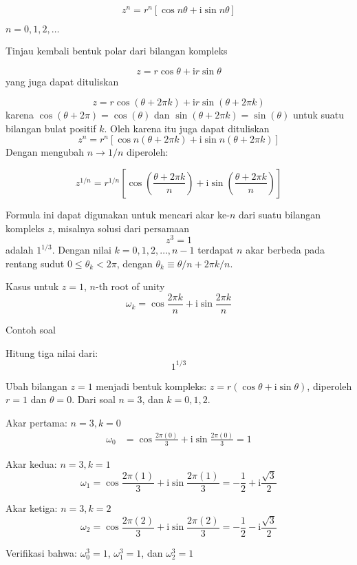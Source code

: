 \[
z^{n}=r^{n}\left[\cos n\theta+\mathrm{i}\sin n\theta\right]
\]

$n=0,1,2,\ldots$

Tinjau kembali bentuk polar dari bilangan kompleks

\[
z=r\cos\theta+\mathrm{i}r\sin\theta
\]
yang juga dapat dituliskan

\[
z=r\cos\left(\theta+2\pi k\right)+\mathrm{i}r\sin\left(\theta+2\pi k\right)
\]
karena $\cos(\theta+2\pi)=\cos(\theta)$ dan $\sin(\theta+2\pi k)=\sin(\theta)$
untuk suatu bilangan bulat positif $k$. Oleh karena itu juga dapat
dituliskan
\[
z^{n}=r^{n}\left[\cos n\left(\theta+2\pi k\right)+\mathrm{i}\sin n\left(\theta+2\pi k\right)\right]
\]
Dengan mengubah $n\rightarrow1/n$ diperoleh:

\[
z^{1/n}=r^{1/n}\left[\cos\left(\frac{\theta+2\pi k}{n}\right)+\mathrm{i}\sin\left(\frac{\theta+2\pi k}{n}\right)\right]
\]

Formula ini dapat digunakan untuk mencari akar ke-$n$ dari suatu
bilangan kompleks $z$, misalnya solusi dari persamaan
\[
z^{3}=1
\]
adalah $1^{1/3}.$ Dengan nilai $k=0,1,2,\ldots,n-1$ terdapat $n$
akar berbeda pada rentang sudut $0\leq\theta_{k}<2\pi$, dengan $\theta_{k}\equiv\theta/n+2\pi k/n$.

Kasus untuk $z=1$, $n$-th root of unity
\[
\omega_{k}=\cos\frac{2\pi k}{n}+\mathrm{i}\sin\frac{2\pi k}{n}
\]

Contoh soal

Hitung tiga nilai dari:
\[
1^{1/3}
\]

Ubah bilangan $z=1$ menjadi bentuk kompleks: $z=r(\cos\theta+\mathrm{i}\sin\theta)$,
diperoleh $r=1$ dan $\theta=0$. Dari soal $n=3$, dan $k=0,1,2$.

Akar pertama: $n=3,k=0$
\begin{align*}
\omega_{0} & =\cos\frac{2\pi(0)}{3}+\mathrm{i}\sin\frac{2\pi(0)}{3}=1
\end{align*}

Akar kedua: $n=3,k=1$
\[
\omega_{1}=\cos\frac{2\pi(1)}{3}+\mathrm{i}\sin\frac{2\pi(1)}{3}=-\frac{1}{2}+\mathrm{i}\frac{\sqrt{3}}{2}
\]

Akar ketiga: $n=3,k=2$
\[
\omega_{2}=\cos\frac{2\pi(2)}{3}+\mathrm{i}\sin\frac{2\pi(2)}{3}=-\frac{1}{2}-\mathrm{i}\frac{\sqrt{3}}{2}
\]

Verifikasi bahwa: $\omega_{0}^{3}=1$, $\omega_{1}^{3}=1$, dan $\omega_{2}^{3}=1$







